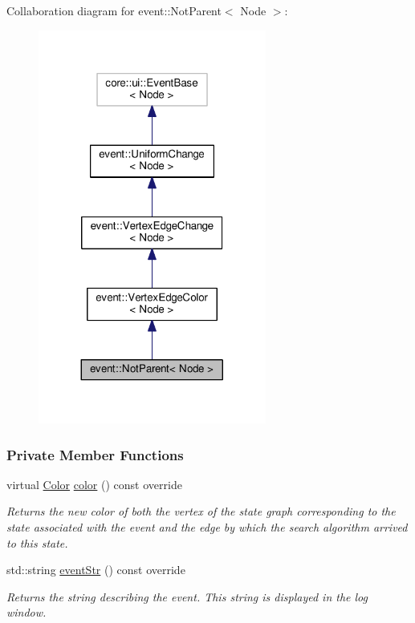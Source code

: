 Collaboration diagram for event\+:\+:Not\+Parent$<$ Node $>$\+:\nopagebreak
\begin{figure}[H]
\begin{center}
\leavevmode
\includegraphics[width=212pt]{structevent_1_1NotParent__coll__graph}
\end{center}
\end{figure}
\subsubsection*{Private Member Functions}
\begin{DoxyCompactItemize}
\item 
virtual \hyperlink{colors_8h_ab87bacfdad76e61b9412d7124be44c1c}{Color} \hyperlink{structevent_1_1NotParent_a9fabd60ffa7bc15d55e27741a95b20d1}{color} () const override
\begin{DoxyCompactList}\small\item\em Returns the new color of both the vertex of the state graph corresponding to the state associated with the event and the edge by which the search algorithm arrived to this state. \end{DoxyCompactList}\item 
std\+::string \hyperlink{structevent_1_1NotParent_a79f26f3ada7777a7b6ce88e2148779aa}{event\+Str} () const override
\begin{DoxyCompactList}\small\item\em Returns the string describing the event. This string is displayed in the log window. \end{DoxyCompactList}\end{DoxyCompactItemize}
